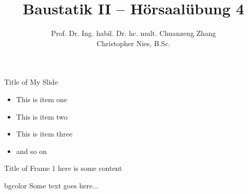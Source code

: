 \documentclass[aspectratio=169]{beamer}
\title{Baustatik II -- Hörsaalübung 4}
\author{
    Prof. Dr. Ing. habil. Dr. hc. mult. Chuanzeng Zhang \\
    Christopher Nies, B.Sc.}
\institute{Lehrstuhl für Baustatik}
\begin{document}
\begin{frame}
    \titlepage
\end{frame}

\begin{frame}[t]{Title of My Slide}%
\begin{itemize}
    \item This is item one
    \item This is item two
    \item This is item three
    \item and so on   
\end{itemize}
\end{frame}

\begin{frame}[t]{Title of Frame 1}
    here is some content
\end{frame}

\begin{frame}
\begin{beamercolorbox}[rounded=true, center, shadow=true,wd=6cm]{bgcolor}
    Some text goes here...
\end{beamercolorbox}
\end{frame}
\end{document}
